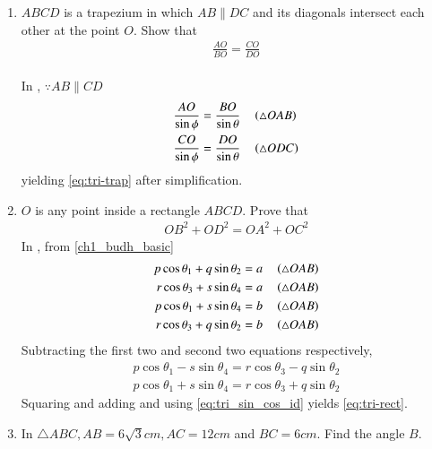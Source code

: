 \begin{enumerate}[label=\thesubsection.\arabic*.,ref=\thesubsection.\theenumi]
\begin{figure}[H]
	\caption{}
	\label{fig:tri-hyp}	
\end{figure}
\item $ABCD$ is a trapezium in which $AB  \parallel  DC$ and its diagonals intersect each other at the point $O$. Show
that
\begin{align}
	\label{eq:tri-trap}	
\frac{AO}{ BO}=\frac{CO}{  DO}
\end{align}
\\
\solution 
	In , $\because AB \parallel CD$	
\begin{align}
	\frac{AO}{\sin \phi} &= \frac{BO}{\sin \theta} \quad \left(\triangle OAB\right)
	\\
	\frac{CO}{\sin \phi} &= \frac{DO}{\sin \theta} \quad \left(\triangle ODC\right)
\end{align}
yielding
	\eqref{eq:tri-trap}	
	after simplification.
\begin{figure}[H]
	\begin{center}
			\resizebox{0.6\columnwidth}{!}{}
	\end{center}
	\caption{}
	\label{fig:tri-trap}	
\end{figure}
\item $O$ is any point inside a rectangle $ABCD$. Prove that 
\begin{align}
	OB^2+OD^2 = OA^2+OC^2
	\label{eq:tri-rect}	
\end{align}
	\solution
	In 
	,	
from \eqref{ch1_budh_basic}
\begin{align}
	p \cos \theta_1+q \sin \theta_2 = a \quad \left(\triangle OAB\right)
	\\
	r \cos \theta_3+s \sin \theta_4 = a \quad \left(\triangle OAB\right)
	\\
	p \cos \theta_1+s \sin \theta_4 = b \quad \left(\triangle OAB\right)
	\\
	r \cos \theta_3+q \sin \theta_2 = b \quad \left(\triangle OAB\right)
\end{align}
Subtracting the first two and second two equations respectively,
\begin{align}
	p \cos \theta_1 
	-s \sin \theta_4  
= r \cos \theta_3-q \sin \theta_2
\\
	p \cos \theta_1+s \sin \theta_4 = 
	r \cos \theta_3+q \sin \theta_2  
\end{align}
Squaring and adding and using 
\eqref{eq:tri_sin_cos_id}
yields
	\eqref{eq:tri-rect}.	
\begin{figure}[H]
	\begin{center}
			\resizebox{0.6\columnwidth}{!}{}
	\end{center}
	\caption{}
	\label{fig:tri-rect}	
\end{figure}
\item  In  $\triangle  ABC, AB = 6\sqrt{3} cm, AC = 12 cm$ and $BC = 6 cm$. Find the angle $B$.
\end{enumerate}
